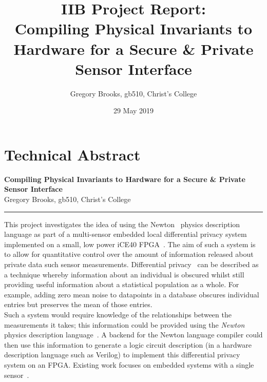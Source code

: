 \documentclass[12pt]{article}
\begin{document}

\clearpage \mbox{}
\clearpage
{}

\noindent

%
%

\title
{
  IIB Project Report:\\
  Compiling Physical Invariants to Hardware for a Secure \& Private Sensor Interface\\
}
\author{Gregory Brooks, gb510, Christ's College}
\date{29 May 2019}
\maketitle

\tableofcontents

\clearpage
{}

%
%
\pagestyle{technical_abstract}
\section{Technical Abstract}

\begin{center}
{
  \bf Compiling Physical Invariants to Hardware for a Secure \& Private Sensor Interface\\
}
Gregory Brooks, gb510, Christ's College
\end{center}
\rule{15.7cm}{0.5mm}
\vspace{1cm}

This project investigates the idea of using the Newton~\cite{Newton} physics description language as part of a multi-sensor embedded local differential privacy system implemented on a small, low power iCE40 FPGA~\cite{iCE40}. The aim of such a system is to allow for quantitative control over the amount of information released about private data such sensor measurements. Differential privacy~\cite{dwork2010differential} can be described as a technique whereby information about an individual is obscured whilst still providing useful information about a statistical population as a whole. For example, adding zero mean noise to datapoints in a database obscures individual entries but preserves the mean of those entries.\\

Such a system would require knowledge of the relationships between the measurements it takes; this information could be provided using the \textit{Newton} physics description language~\cite{Newton}. A backend for the Newton language compiler could then use this information to generate a logic circuit description (in a hardware description language such as Verilog) to implement this differential privacy system on an FPGA. Existing work focuses on embedded systems with a single sensor~\cite{Choi2018GuaranteeingLD}.\\
\end{document}
